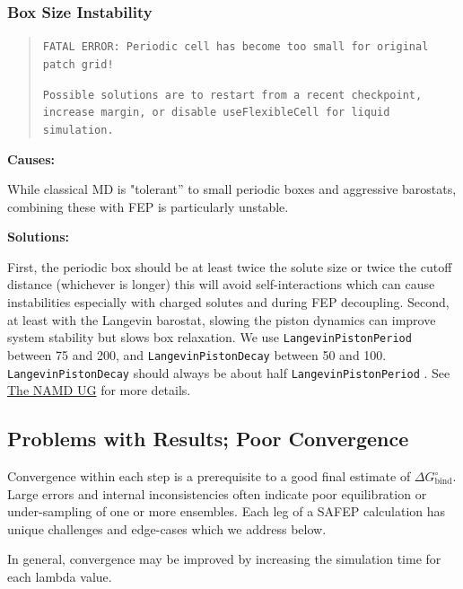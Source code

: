 \documentclass[9pt,tutorial]{Styling/livecoms}
\newcommand{\textInput}[1]{
  \texttt{#1}
}
\begin{document}
\subsubsection{Box Size Instability}
\begin{quote}
\texttt{FATAL ERROR: Periodic cell has become too small for original patch grid!}

\texttt{Possible solutions are to restart from a recent checkpoint,
increase margin, or disable useFlexibleCell for liquid simulation.}
\end{quote}

\noindent\textbf{Causes:}

While classical MD is "tolerant'' to small periodic boxes and aggressive barostats, combining these with FEP is particularly unstable.

\noindent\textbf{Solutions:}

First, the periodic box should be at least twice the solute size or twice the cutoff distance (whichever is longer) this will avoid self-interactions which can cause instabilities especially with charged solutes and during FEP decoupling. Second, at least with the Langevin barostat, slowing the piston dynamics can improve system stability but slows box relaxation. We use \textInput{LangevinPistonPeriod} between 75 and 200, and \textInput{LangevinPistonDecay} between 50 and 100. \textInput{LangevinPistonDecay} should always be about half \textInput{LangevinPistonPeriod}. See \href{https://www.ks.uiuc.edu/Research/namd/2.14/ug/node39.html}{The NAMD UG} for more details. \cite{Bernardi2020}





\subsection{Problems with Results; Poor Convergence}

Convergence within each step is a prerequisite to a good final estimate of $\Delta G^\circ_\mathrm{bind}$. Large errors and internal inconsistencies often indicate poor equilibration or under-sampling of one or more ensembles. Each leg of a SAFEP calculation has unique challenges and edge-cases which we address below. 

In general, convergence may be improved by increasing the simulation time for each lambda value.
\end{document}
